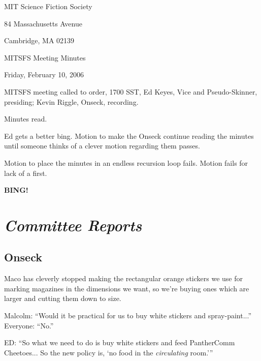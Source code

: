 \documentclass[10pt]{article}
\newcommand{\bing}{{\bf BING!} }
\newcommand{\goto}[1]{\bing \vskip 12pt \section*{{\em{#1}}}}
\begin{document}
\begin{center}

MIT Science Fiction Society

84 Massachusetts Avenue

Cambridge, MA 02139

\vspace{12pt}

MITSFS Meeting Minutes

Friday, February 10, 2006

\end{center}

\vspace{18pt}

\setlength{\parskip}{6pt}

\noindent
MITSFS meeting called to order, 1700 SST,
Ed Keyes, Vice and Pseudo-Skinner, presiding; Kevin Riggle, Onseck, recording.

Minutes read.

Ed gets a better bing.  Motion to make the Onseck continue reading the minutes
until someone thinks of a clever motion regarding them passes.

Motion to place the minutes in an endless recursion loop fails.  Motion fails
for lack of a first.

\goto{Committee Reports}

\subsection*{Onseck}
Maco has cleverly stopped making the rectangular orange stickers we use for 
marking magazines in the dimensions we want, so we're buying ones which are
larger and cutting them down to size.

Malcolm: ``Would it be practical for us to buy white stickers and spray-paint...''
Everyone: ``No.''

ED: ``So what we need to do is buy white stickers and feed PantherComm 
Cheetoes...  So the new policy is, `no food in the \emph{circulating} room.'''



\end{document}
